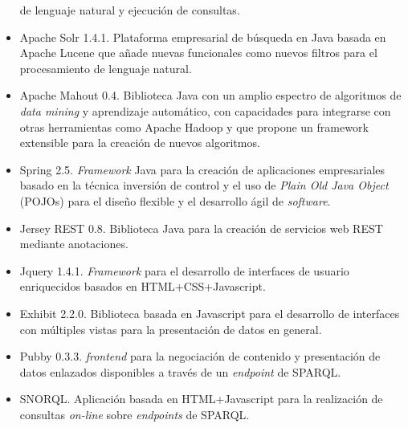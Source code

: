 \begin{itemize}
de lenguaje natural y ejecución de consultas.
\item Apache \gls{Solr} 1.4.1. Plataforma empresarial de búsqueda en Java basada en Apache Lucene que añade nuevas funcionales como nuevos 
filtros para el procesamiento de lenguaje natural.
\item Apache \gls{Mahout} 0.4. Biblioteca Java con un amplio espectro de algoritmos de \textit{data mining} y aprendizaje automático, con capacidades 
para integrarse con otras herramientas como Apache Hadoop y que propone un framework extensible para la creación de nuevos algoritmos.
\item Spring 2.5. \textit{Framework} Java para la creación de aplicaciones empresariales basado en la técnica inversión de control y el uso 
de \textit{Plain Old Java Object} (\gls{POJO}s) para el diseño flexible y el desarrollo ágil de \textit{software}.
\item Jersey \gls{REST} 0.8. Biblioteca Java para la creación de servicios web REST mediante anotaciones.
\item Jquery 1.4.1. \textit{Framework} para el desarrollo de interfaces de usuario enriquecidos basados en HTML+CSS+Javascript.
\item Exhibit 2.2.0. Biblioteca basada en Javascript para el desarrollo de interfaces con múltiples vistas para la presentación 
de datos en general.
\item \gls{Pubby} 0.3.3. \linkeddata \textit{frontend} para la negociación de contenido y presentación de datos enlazados disponibles 
a través de un \textit{endpoint} de \gls{SPARQL}.
\item \gls{SNORQL}. Aplicación basada en HTML+Javascript para la realización de consultas \textit{on-line} sobre \textit{endpoints} de SPARQL.

\end{itemize}



















